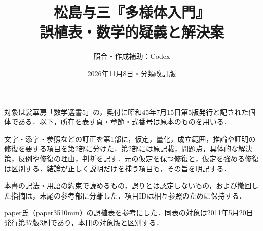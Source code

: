 \documentclass[a4paper,10pt]{ltjsarticle}
\title{松島与三『多様体入門』\\誤植表・数学的疑義と解決案}
\author{照合・作成補助：Codex}
\date{2026年11月8日・分類改訂版}
\begin{document}
\maketitle
\pagestyle{empty}\thispagestyle{empty}
\noindent 対象は裳華房「数学選書5」の，奥付に昭和45年7月15日第5版発行と記された個体である\cite{matsushima}．以下，所在を表す頁・章節・式番号は原本のものを用いる．

文字・添字・参照などの訂正を第1部に，仮定，量化，成立範囲，推論や証明の修復を要する項目を第2部に分けた．第2部には原記載，問題点，具体的な解決策，反例や修復の理由，判断を記す．元の仮定を保つ修復と，仮定を強める修復は区別する．結論が正しく説明だけを補う項目も，その旨を明記する．

本書の記法・用語の約束で読めるもの，誤りとは認定しないもの，および撤回した指摘は，末尾の参考部に分離した．項目IDは相互参照のために保持する．

paper氏（paper3510mm）の誤植表\cite{paper2017}を参考にした．同表の対象は2011年5月20日発行第37版3刷であり，本冊の対象版と区別する．
\end{document}
